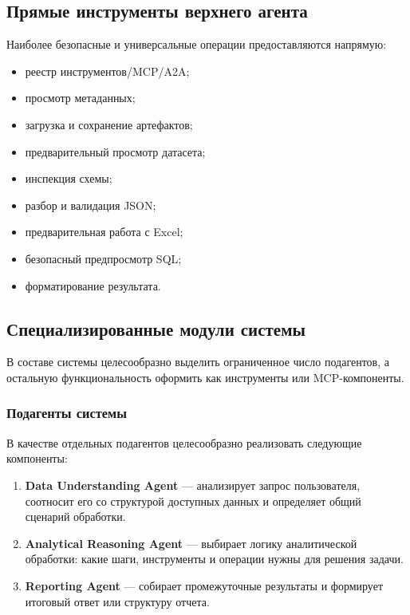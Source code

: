 \documentclass[14pt,a4paper]{extarticle}
\begin{document}
\subsection{Прямые инструменты верхнего агента}

Наиболее безопасные и универсальные операции предоставляются напрямую:
\begin{itemize}
    \item реестр инструментов/MCP/A2A;
    \item просмотр метаданных;
    \item загрузка и сохранение артефактов;
    \item предварительный просмотр датасета;
    \item инспекция схемы;
    \item разбор и валидация JSON;
    \item предварительная работа с Excel;
    \item безопасный предпросмотр SQL;
    \item форматирование результата.
\end{itemize}

\subsection{Специализированные модули системы}

В составе системы целесообразно выделить ограниченное число подагентов, а остальную функциональность оформить как инструменты или MCP-компоненты.

\subsubsection{Подагенты системы}

В качестве отдельных подагентов целесообразно реализовать следующие компоненты:

\begin{enumerate}
    \item \textbf{Data Understanding Agent} --- анализирует запрос пользователя, соотносит его со структурой доступных данных и определяет общий сценарий обработки.

    \item \textbf{Analytical Reasoning Agent} --- выбирает логику аналитической обработки: какие шаги, инструменты и операции нужны для решения задачи.

    \item \textbf{Reporting Agent} --- собирает промежуточные результаты и формирует итоговый ответ или структуру отчета.
\end{enumerate}
\end{document}
